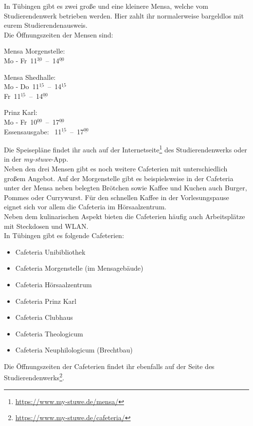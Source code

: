 
In Tübingen gibt es zwei große und eine kleinere Mensa, welche vom
Studierendenwerk betrieben werden. Hier zahlt ihr normalerweise bargeldlos mit
eurem Studierendenausweis.\\ Die Öffnungszeiten der Mensen sind:
\begin{center}

Mensa Morgenstelle:\\
Mo - Fr~11$^{\underline{30}}$~--~14$^{\underline{00}}$

\bigskip

Mensa Shedhalle:\\
Mo - Do~11$^{\underline{15}}$~--~14$^{\underline{15}}$\\
Fr~11$^{\underline{15}}$~--~14$^{\underline{00}}$

\nopagebreak
Prinz Karl:\\
Mo - Fr~10$^{\underline{00}}$~--~17$^{\underline{00}}$\\
Essensausgabe: ~11$^{\underline{15}}$~--~17$^{\underline{00}}$

\end{center}

Die Speisepläne findet ihr auch auf der
Internetseite\footnote{\url{https://www.my-stuwe.de/mensa/}} des
Studierendenwerks oder in der \emph{my-stuwe}-App.\\	%

Neben den drei Mensen gibt es noch weitere Cafeterien mit unterschiedlich
großem Angebot. Auf der Morgenstelle gibt es beispielsweise in der Cafeteria
unter der Mensa neben belegten Brötchen sowie Kaffee und Kuchen auch Burger,
Pommes oder Currywurst. Für den schnellen Kaffee in der Vorlesungspause eignet
sich vor allem die Cafeteria im Hörsaalzentrum.\\ Neben dem kulinarischen
Aspekt bieten die Cafeterien häufig auch Arbeitsplätze mit Steckdosen und
WLAN.\\
In Tübingen gibt es folgende Cafeterien:
\begin{itemize}
	\item Cafeteria Unibibliothek
	\item Cafeteria Morgenstelle (im Mensagebäude)
	\item Cafeteria Hörsaalzentrum
	\item Cafeteria Prinz Karl
	\item Cafeteria Clubhaus
	\item Cafeteria Theologicum
	\item Cafeteria Neuphilologicum (Brechtbau)
\end{itemize} Die Öffnungszeiten der Cafeterien findet ihr ebenfalls auf der
Seite des Studierendenwerks\footnote{\url{https://www.my-stuwe.de/cafeteria/}}.
